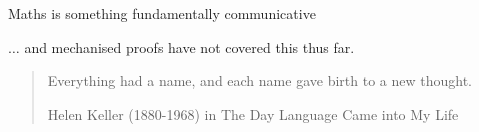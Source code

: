 \begin{frame}{Maths is something fundamentally communicative}

  $\dots$ and mechanised proofs have not covered this thus far.

  \vspace{5em}

  \blockquote[Helen Keller (1880-1968) in The Day Language Came into My Life]{
    Everything had a name, and each name gave birth to a new thought.
  }





% 






\end{frame}


